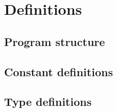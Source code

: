 \section{Definitions}
\label{sec:definitions}


\subsection{Program structure}


\subsection{Constant definitions}


\subsection{Type definitions}
